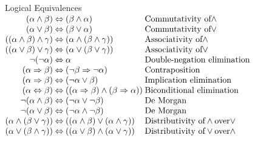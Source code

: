 \documentclass[14pt]{beamer}
\newcommand{\limpl}{\Rightarrow}
\newcommand{\liff}{\Leftrightarrow}
\begin{document}
\begin{frame}{Logical Equivalences}
	\footnotesize
	$
	\begin{array}{@{}r@{\hspace{.25em}}c@{\hspace{.25em}}l@{\hspace{.25em}}l}
	(\alpha \land \beta)                &\liff& (\beta \land \alpha)                             & \mbox{Commutativity of} \land\\
	(\alpha \lor \beta)                 &\liff& (\beta\lor \alpha)                               & \mbox{Commutativity of} \lor\\
	((\alpha \land \beta)\land \gamma)  &\liff& (\alpha\land (\beta\land \gamma))                & \mbox{Associativity of} \land\\
	((\alpha \lor \beta)\lor \gamma)    &\liff& (\alpha\lor (\beta\lor \gamma))                  & \mbox{Associativity of} \lor\\
	\lnot(\lnot \alpha)                 &\liff& \alpha                                           & \mbox{Double-negation elimination}\\
	(\alpha \limpl \beta)               &\liff& (\lnot \beta \limpl \lnot \alpha)                & \mbox{Contraposition}\\
	(\alpha \limpl \beta)               &\liff& (\lnot \alpha \lor \beta)                        & \mbox{Implication elimination}\\
	(\alpha \liff \beta)                &\liff& ((\alpha\limpl \beta)\land (\beta\limpl \alpha)) & \mbox{Biconditional elimination}\\
	\lnot(\alpha \land \beta)           &\liff& (\lnot \alpha \lor \lnot \beta)                  & \mbox{De Morgan}\\
	\lnot(\alpha \lor \beta)            &\liff& (\lnot \alpha \land \lnot \beta)                 & \mbox{De Morgan}\\
	(\alpha \land (\beta \lor \gamma))  &\liff& ((\alpha\land \beta)\lor (\alpha\land \gamma))   & \mbox{Distributivity of} \land \mbox{over} \lor\\
	(\alpha \lor (\beta \land \gamma))  &\liff& ((\alpha\lor \beta)\land (\alpha\lor \gamma))    & \mbox{Distributivity of} \lor \mbox{over} \land
	\end{array}
	$
\end{frame}
\end{document}
